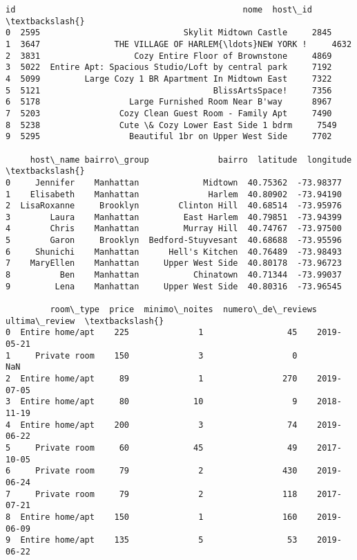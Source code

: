 \documentclass[11pt]{article}
\makeatletter
\newcommand{\boxspacing}{\kern\kvtcb@left@rule\kern\kvtcb@boxsep}
\newcommand{\prompt}[4]{
        {\ttfamily\llap{{\color{#2}[#3]:\hspace{3pt}#4}}\vspace{-\baselineskip}}
    }
\makeatother
\begin{document}
            \begin{tcolorbox}[breakable, size=fbox, boxrule=.5pt, pad at break*=1mm, opacityfill=0]
\prompt{Out}{outcolor}{227}{\boxspacing}
\begin{Verbatim}[commandchars=\\\{\}]
     id                                              nome  host\_id  \textbackslash{}
0  2595                             Skylit Midtown Castle     2845
1  3647               THE VILLAGE OF HARLEM{\ldots}NEW YORK !     4632
2  3831                   Cozy Entire Floor of Brownstone     4869
3  5022  Entire Apt: Spacious Studio/Loft by central park     7192
4  5099         Large Cozy 1 BR Apartment In Midtown East     7322
5  5121                                   BlissArtsSpace!     7356
6  5178                  Large Furnished Room Near B'way      8967
7  5203                Cozy Clean Guest Room - Family Apt     7490
8  5238                Cute \& Cozy Lower East Side 1 bdrm     7549
9  5295                  Beautiful 1br on Upper West Side     7702

     host\_name bairro\_group              bairro  latitude  longitude  \textbackslash{}
0     Jennifer    Manhattan             Midtown  40.75362  -73.98377
1    Elisabeth    Manhattan              Harlem  40.80902  -73.94190
2  LisaRoxanne     Brooklyn        Clinton Hill  40.68514  -73.95976
3        Laura    Manhattan         East Harlem  40.79851  -73.94399
4        Chris    Manhattan         Murray Hill  40.74767  -73.97500
5        Garon     Brooklyn  Bedford-Stuyvesant  40.68688  -73.95596
6     Shunichi    Manhattan      Hell's Kitchen  40.76489  -73.98493
7    MaryEllen    Manhattan     Upper West Side  40.80178  -73.96723
8          Ben    Manhattan           Chinatown  40.71344  -73.99037
9         Lena    Manhattan     Upper West Side  40.80316  -73.96545

         room\_type  price  minimo\_noites  numero\_de\_reviews ultima\_review  \textbackslash{}
0  Entire home/apt    225              1                 45    2019-05-21
1     Private room    150              3                  0           NaN
2  Entire home/apt     89              1                270    2019-07-05
3  Entire home/apt     80             10                  9    2018-11-19
4  Entire home/apt    200              3                 74    2019-06-22
5     Private room     60             45                 49    2017-10-05
6     Private room     79              2                430    2019-06-24
7     Private room     79              2                118    2017-07-21
8  Entire home/apt    150              1                160    2019-06-09
9  Entire home/apt    135              5                 53    2019-06-22


\end{Verbatim}
\end{tcolorbox}
\end{document}
